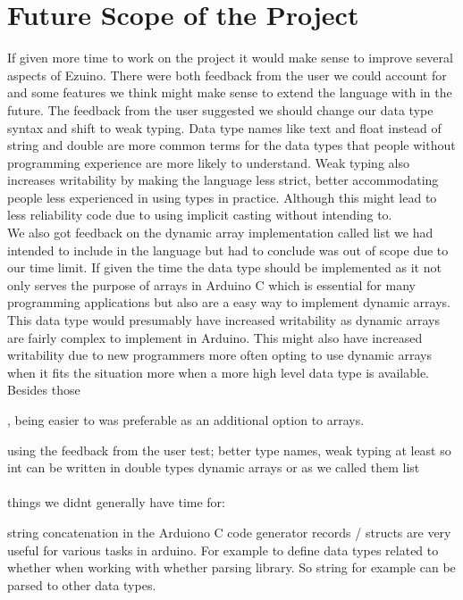 \chapter{Future Scope of the Project}
If given more time to work on the project it would make sense to improve several aspects of Ezuino. There were both feedback from the user we could account for and some features we think might make sense to extend the language with in the future.
The feedback from the user suggested we should change our data type syntax and shift to weak typing. Data type names like text and float instead of string and double are more common terms for the data types that people without programming experience are more likely to understand. Weak typing also increases writability by making the language less strict, better accommodating people less experienced in using types in practice. Although this might lead to less reliability code due to using implicit casting without intending to. \\
We also got feedback on the dynamic array implementation called list we had intended to include in the language but had to conclude was out of scope due to our time limit. If given the time the data type should be implemented as it not only serves the purpose of arrays in Arduino C which is essential for many programming applications but also are a easy way to implement dynamic arrays. This data type would presumably have increased writability as dynamic arrays are fairly complex to implement in Arduino. This might also have increased writability due to new programmers more often opting to use dynamic arrays when it fits the situation more when a more high level data type is available. \\
Besides those 



, being easier to was preferable as an additional option to arrays.

using the feedback from the user test; better type names, weak typing at least so int can be written in double types
dynamic arrays or as we called them list
\\\\
things we didnt generally have time for:

string concatenation in the Arduiono C code generator
records / structs are very useful for various tasks in arduino. For example to define data types related to whether when working with whether
parsing library. So string for example can be parsed to other data types.


